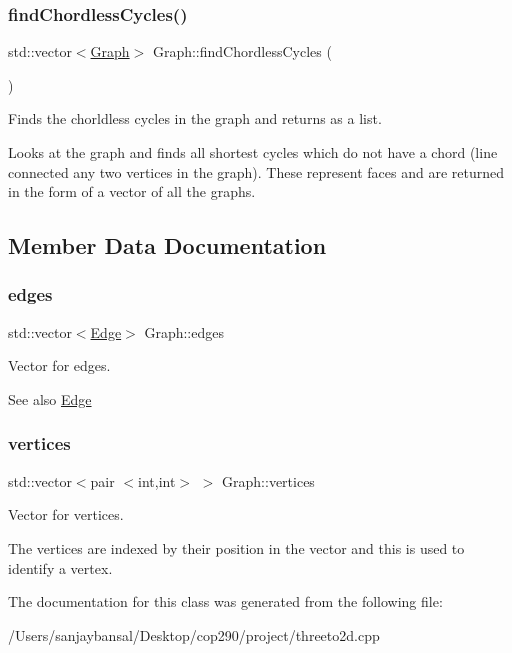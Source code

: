 \subsubsection{\texorpdfstring{find\+Chordless\+Cycles()}{findChordlessCycles()}}
{\footnotesize\ttfamily std\+::vector$<$\mbox{\hyperlink{class_graph}{Graph}}$>$ Graph\+::find\+Chordless\+Cycles (\begin{DoxyParamCaption}{ }\end{DoxyParamCaption})}



Finds the chorldless cycles in the graph and returns as a list. 

Looks at the graph and finds all shortest cycles which do not have a chord (line connected any two vertices in the graph). These represent faces and are returned in the form of a vector of all the graphs. 

\subsection{Member Data Documentation}
\mbox{\label{class_graph_a28d19ea9c7d111f55fee78331abe88bd}} 
\subsubsection{\texorpdfstring{edges}{edges}}
{\footnotesize\ttfamily std\+::vector$<$\mbox{\hyperlink{struct_edge}{Edge}}$>$ Graph\+::edges}



Vector for edges. 

\begin{DoxySeeAlso}{See also}
\mbox{\hyperlink{struct_edge}{Edge}} 
\end{DoxySeeAlso}
\mbox{\label{class_graph_aa2eb1fa662b40441949fc7f0d0d2a3ad}} 
\subsubsection{\texorpdfstring{vertices}{vertices}}
{\footnotesize\ttfamily std\+::vector$<$pair $<$int,int$>$ $>$ Graph\+::vertices}



Vector for vertices. 

The vertices are indexed by their position in the vector and this is used to identify a vertex. 

The documentation for this class was generated from the following file\+:\begin{DoxyCompactItemize}
\item 
/\+Users/sanjaybansal/\+Desktop/cop290/project/threeto2d.\+cpp\end{DoxyCompactItemize}
